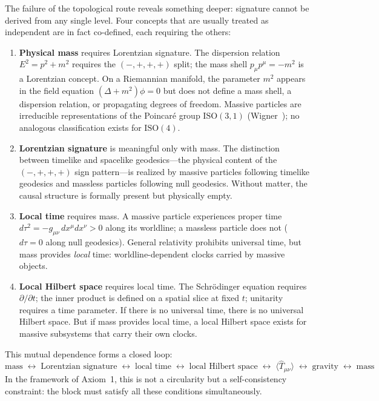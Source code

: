 \documentclass[12pt,a4paper]{article}
\theoremstyle{definition}
\theoremstyle{remark}
\begin{document}
The failure of the topological route reveals something deeper: signature cannot
be derived from any single level. Four concepts that are usually treated as
independent are in fact co-defined, each requiring the others:
\begin{enumerate}
\item \textbf{Physical mass} requires Lorentzian signature. The dispersion
relation $E^2 = p^2 + m^2$ requires the $(-,+,+,+)$ split; the mass shell
$p_\mu p^\mu = -m^2$ is a Lorentzian concept. On a Riemannian manifold, the
parameter $m^2$ appears in the field equation $(\Delta + m^2)\phi = 0$ but
does not define a mass shell, a dispersion relation, or propagating degrees of
freedom. Massive particles are irreducible representations of the Poincar\'e
group $\mathrm{ISO}(3,1)$ (Wigner~\cite{wigner}); no analogous classification
exists for $\mathrm{ISO}(4)$.

\item \textbf{Lorentzian signature} is meaningful only with mass. The
distinction between timelike and spacelike geodesics---the physical content of
the $(-,+,+,+)$ sign pattern---is realized by massive particles following
timelike geodesics and massless particles following null geodesics. Without
matter, the causal structure is formally present but physically empty.

\item \textbf{Local time} requires mass. A massive particle experiences proper
time $d\tau^2 = -g_{\mu\nu}\,dx^\mu dx^\nu > 0$ along its worldline; a massless
particle does not ($d\tau = 0$ along null geodesics). General relativity
prohibits universal time, but mass provides \emph{local} time:
worldline-dependent clocks carried by massive objects.

\item \textbf{Local Hilbert space} requires local time. The Schr\"odinger
equation requires $\partial/\partial t$; the inner product is defined on a
spatial slice at fixed $t$; unitarity requires a time parameter. If there is no
universal time, there is no universal Hilbert space. But if mass provides
local time, a local Hilbert space exists for massive subsystems that carry
their own clocks.
\end{enumerate}

\noindent This mutual dependence forms a closed loop:
\begin{equation}
\text{mass} \;\longleftrightarrow\; \text{Lorentzian signature}
\;\longleftrightarrow\; \text{local time}
\;\longleftrightarrow\; \text{local Hilbert space}
\;\longleftrightarrow\; \langle\hat{T}_{\mu\nu}\rangle
\;\longleftrightarrow\; \text{gravity}
\;\longleftrightarrow\; \text{mass}
\label{eq:co_emergence}
\end{equation}
In the framework of Axiom~1, this is not a circularity but a self-consistency
constraint: the block must satisfy all these conditions simultaneously.
\end{document}
